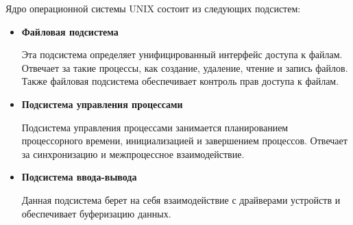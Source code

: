 Ядро операционной системы UNIX состоит из следующих подсистем:

\begin{itemize}
	\item \textbf{Файловая подсистема}

		Эта подсистема определяет унифицированный интерфейс доступа к файлам. Отвечает за такие процессы, как создание, удаление, чтение и запись файлов. Также файловая подсистема обеспечивает контроль прав доступа к файлам.

	\item \textbf{Подсистема управления процессами}

		Подсистема управления процессами занимается планированием процессорного времени, инициализацией и завершением процессов. Отвечает за синхронизацию и межпроцессное взаимодействие.

	\newpage
	\item \textbf{Подсистема ввода-вывода}

		Данная подсистема берет на себя взаимодействие с драйверами устройств и обеспечивает буферизацию данных.
\end{itemize}